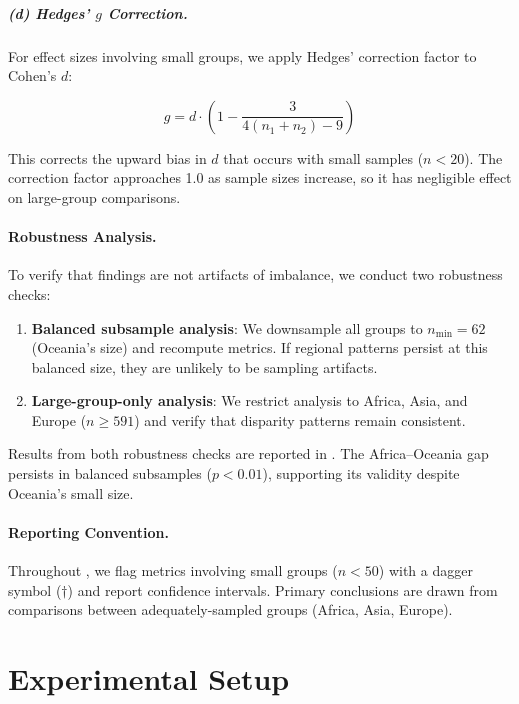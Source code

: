 \documentclass{article}
\begin{document}
\subparagraph{(d) Hedges' $g$ Correction.} For effect sizes involving small groups, we apply Hedges' correction factor to Cohen's $d$:

\begin{equation}
g = d \cdot \left(1 - \frac{3}{4(n_1 + n_2) - 9}\right)
\label{eq:hedges_g}
\end{equation}

This corrects the upward bias in $d$ that occurs with small samples ($n < 20$). The correction factor approaches 1.0 as sample sizes increase, so it has negligible effect on large-group comparisons.

\paragraph{Robustness Analysis.} To verify that findings are not artifacts of imbalance, we conduct two robustness checks:

\begin{enumerate}[nosep,leftmargin=*]
    \item \textbf{Balanced subsample analysis}: We downsample all groups to $n_{\min} = 62$ (Oceania's size) and recompute metrics. If regional patterns persist at this balanced size, they are unlikely to be sampling artifacts.

    \item \textbf{Large-group-only analysis}: We restrict analysis to Africa, Asia, and Europe ($n \geq 591$) and verify that disparity patterns remain consistent.
\end{enumerate}

Results from both robustness checks are reported in . The Africa--Oceania gap persists in balanced subsamples ($p < 0.01$), supporting its validity despite Oceania's small size.

\paragraph{Reporting Convention.} Throughout , we flag metrics involving small groups ($n < 50$) with a dagger symbol ($\dagger$) and report confidence intervals. Primary conclusions are drawn from comparisons between adequately-sampled groups (Africa, Asia, Europe).

\section{Experimental Setup}
\label{sec:setup}
\end{document}
